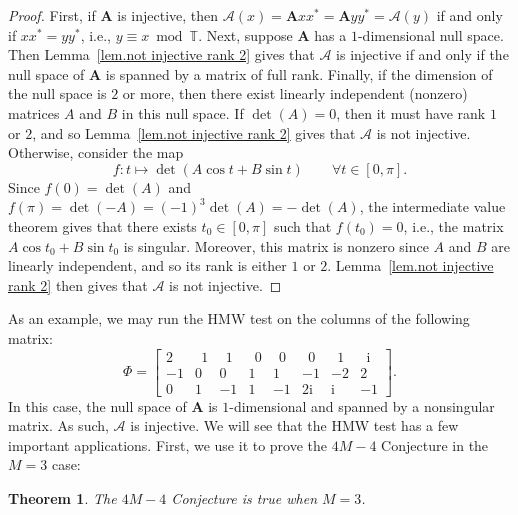 \documentclass[times,10pt]{elsarticle}
\theoremstyle{plain}
\newtheorem{theorem}{Theorem}
\begin{document}
\begin{proof}
First, if $\mathbf{A}$ is injective, then $\mathcal{A}(x)=\mathbf{A}xx^*=\mathbf{A}yy^*=\mathcal{A}(y)$ if and only if $xx^*=yy^*$, i.e., $y\equiv x\bmod\mathbb{T}$.
Next, suppose $\mathbf{A}$ has a $1$-dimensional null space.
Then Lemma~\ref{lem.not injective rank 2} gives that $\mathcal{A}$ is injective if and only if the null space of $\mathbf{A}$ is spanned by a matrix of full rank.
Finally, if the dimension of the null space is $2$ or more, then there exist linearly independent (nonzero) matrices $A$ and $B$ in this null space.
If $\det{(A)}=0$, then it must have rank $1$ or $2$, and so Lemma~\ref{lem.not injective rank 2} gives that $\mathcal{A}$ is not injective.
Otherwise, consider the map
\begin{equation*}
f\colon t\mapsto \det{(A\cos{t}+B\sin{t})}\qquad\forall t\in[0,\pi].
\end{equation*}
Since $f(0)=\det{(A)}$ and $f(\pi)=\det{(-A)}=(-1)^3\det{(A)}=-\det{(A)}$, the intermediate value theorem gives that there exists $t_0\in[0,\pi]$ such that $f(t_0)=0$, i.e., the matrix $A\cos{t_0}+B\sin{t_0}$ is singular.
Moreover, this matrix is nonzero since $A$ and $B$ are linearly independent, and so its rank is either $1$ or $2$.
Lemma~\ref{lem.not injective rank 2} then gives that $\mathcal{A}$ is not injective.
\qquad
\end{proof}

As an example, we may run the HMW test on the columns of the following matrix:
\begin{equation}
\label{eq.random cahill example}
\Phi
=\left[
\begin{array}{rrrrrrrr}
2&~~1&~~1&~~0&~~0&~~0&~~1&~~\mathrm{i}\\
-1&0&0&1&1&-1&-2&2\\
0&1&-1&1&-1&2\mathrm{i}&\mathrm{i}&-1
\end{array}
\right].
\end{equation}
In this case, the null space of $\mathbf{A}$ is $1$-dimensional and spanned by a nonsingular matrix.
As such, $\mathcal{A}$ is injective. 
We will see that the HMW test has a few important applications.
First, we use it to prove the $4M-4$ Conjecture in the $M=3$ case:

\begin{theorem}
\label{thm.4M4 true 3}
The $4M-4$ Conjecture is true when $M=3$.
\end{theorem}
\end{document}
